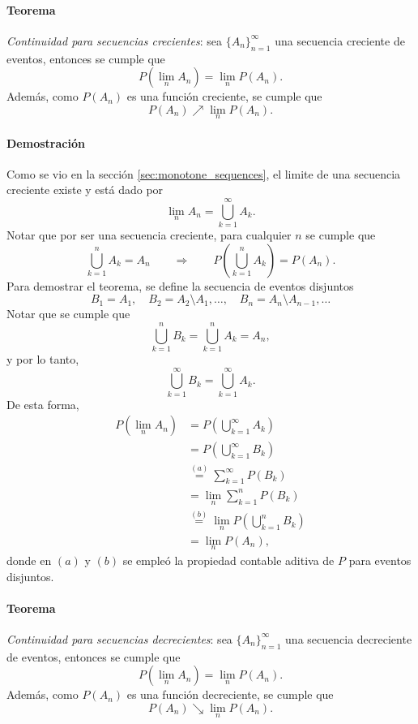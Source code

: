 \documentclass[a4paper]{report}
\begin{document}
\paragraph{Teorema} \emph{Continuidad para secuencias crecientes}: sea \(\{A_n\}_{n=1}^{\infty}\) una secuencia creciente de eventos, entonces se cumple que
\[
 P\left(\lim_n A_n\right)=\lim_n P\left(A_n\right).
\]
Además, como \(P(A_n)\) es una función creciente, se cumple que
\[
 P(A_n)\nearrow\lim_n P(A_n).
\]
\paragraph{Demostración} Como se vio en la sección \ref{sec:monotone_sequences}, el limite de una secuencia creciente existe y está dado por
\[
 \lim_n A_n=\bigcup_{k=1}^{\infty}A_k.
\]
Notar que por ser una secuencia creciente, para cualquier \(n\) se cumple que
\[
 \bigcup_{k=1}^{n}A_k=A_n\qquad\Rightarrow\qquad P\left(\bigcup_{k=1}^{n}A_k\right)=P(A_n).
\]
Para demostrar el teorema, se define la secuencia de eventos disjuntos
\[
 B_1=A_1,\quad B_2=A_2\setminus A_1,\dots,\quad B_n=A_n\setminus A_{n-1},\dots
\]
Notar que se cumple que 
\[
 \bigcup_{k=1}^{n}B_k=\bigcup_{k=1}^{n}A_k=A_n,
\]
y por lo tanto,
\[
 \bigcup_{k=1}^{\infty}B_k=\bigcup_{k=1}^{\infty}A_k.
\]
De esta forma,
\begin{align*}
 P\left(\lim_n A_n\right)&=P\left(\bigcup_{k=1}^{\infty}A_k\right)\\
   &=P\left(\bigcup_{k=1}^{\infty}B_k\right)\\
   &\overset{(a)}{=}\sum_{k=1}^{\infty}P(B_k)\\
   &=\lim_n\sum_{k=1}^{n}P(B_k)\\
   &\overset{(b)}{=}\lim_n P\left(\bigcup_{k=1}^{n}B_k\right)\\
   &=\lim_n P(A_n),
\end{align*}
donde en \((a)\) y \((b)\) se empleó la propiedad contable aditiva de \(P\) para eventos disjuntos.

\paragraph{Teorema} \emph{Continuidad para secuencias decrecientes}: sea \(\{A_n\}_{n=1}^{\infty}\) una secuencia decreciente de eventos, entonces se cumple que
\[
 P\left(\lim_n A_n\right)=\lim_n P\left(A_n\right).
\]
Además, como \(P(A_n)\) es una función decreciente, se cumple que
\[
 P(A_n)\searrow\lim_n P(A_n).
\]
\end{document}
